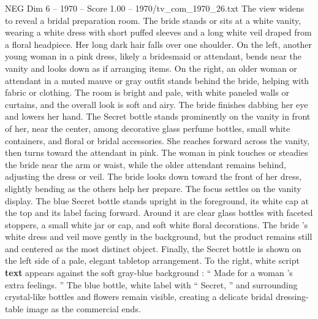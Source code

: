 \begin{textsample}{NEG Dim 6 – 1970 – Score 1.00 – 1970/tv\_com\_1970\_26.txt}
The view widens to reveal a bridal preparation room.
The bride stands or sits at a white vanity, wearing a white dress with short puffed sleeves and a long white veil draped from a floral headpiece.
Her long dark hair falls over one shoulder.
On the left, another young woman in a pink dress, likely a bridesmaid or attendant, bends near the vanity and looks down as if arranging items.
On the right, an older woman or attendant in a muted mauve or gray outfit stands behind the bride, helping with fabric or clothing.
The room is bright and pale, with white paneled walls or curtains, and the overall look is soft and airy.
The bride finishes dabbing her eye and lowers her hand.
The Secret bottle stands prominently on the vanity in front of her, near the center, among decorative glass perfume bottles, small white containers, and floral or bridal accessories.
She reaches forward across the vanity, then turns toward the attendant in pink.
The woman in pink touches or steadies the bride near the arm or waist, while the older attendant remains behind, adjusting the dress or veil.
The bride looks down toward the front of her dress, slightly bending as the others help her prepare.
The focus settles on the vanity display.
The blue Secret bottle stands upright in the foreground, its white cap at the top and its label facing forward.
Around it are clear glass bottles with faceted stoppers, a small white jar or cap, and soft white floral decorations.
The bride ’s white dress and veil move gently in the background, but the product remains still and centered as the most distinct object.
Finally, the Secret bottle is shown on the left side of a pale, elegant tabletop arrangement.
To the right, white script \textbf{text} appears against the soft gray-blue background : “ Made for a woman ’s extra feelings. ” The blue bottle, white label with “ Secret, ” and surrounding crystal-like bottles and flowers remain visible, creating a delicate bridal dressing-table image as the commercial ends.

\end{textsample}
